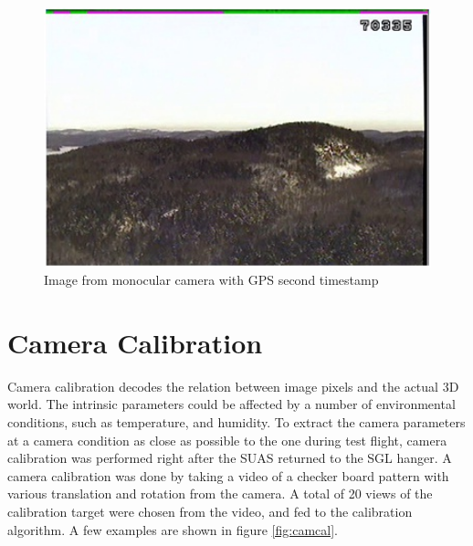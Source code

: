 \begin{figure}[h]
  \centering
  \includegraphics[width=12cm,keepaspectratio=true]{./Figures/video_snapshot.jpg}
  \caption{Image from monocular camera with GPS second timestamp}
  \label{fig:video_snapshot}
\end{figure}

\FloatBarrier

\section{Camera Calibration}\label{sec:camcal}
Camera calibration decodes the relation between image pixels and the
actual 3D world. The intrinsic parameters could be affected by a
number of environmental conditions, such as temperature, and humidity.
To extract the camera parameters at a camera condition as close as
possible to the one during test flight, camera calibration was
performed right after the SUAS returned to the SGL hanger. A camera
calibration was done by taking a video of a checker board pattern with
various translation and rotation from the camera. A total of 20 views
of the calibration target were chosen from the video, and fed to the
calibration algorithm. A few examples are shown in figure
\ref{fig:camcal}.

